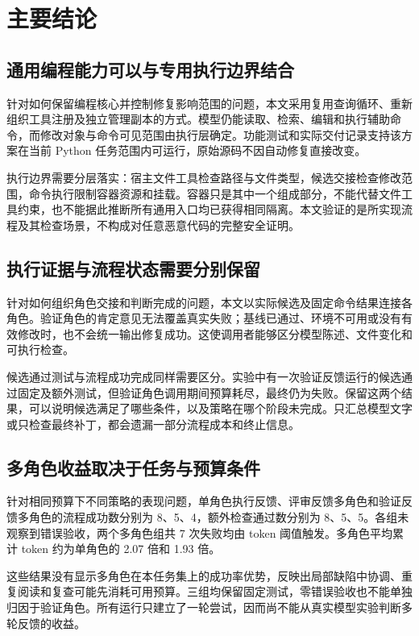\section{主要结论}\label{sec:7.2}

\subsection{通用编程能力可以与专用执行边界结合}\label{sec:7.2.1}

针对如何保留编程核心并控制修复影响范围的问题，本文采用复用查询循环、重新组织工具注册及独立管理副本的方式。模型仍能读取、检索、编辑和执行辅助命令，而修改对象与命令可见范围由执行层确定。功能测试和实际交付记录支持该方案在当前 Python 任务范围内可运行，原始源码不因自动修复直接改变。

执行边界需要分层落实：宿主文件工具检查路径与文件类型，候选交接检查修改范围，命令执行限制容器资源和挂载。容器只是其中一个组成部分，不能代替文件工具约束，也不能据此推断所有通用入口均已获得相同隔离。本文验证的是所实现流程及其检查场景，不构成对任意恶意代码的完整安全证明。

\subsection{执行证据与流程状态需要分别保留}\label{sec:7.2.2}

针对如何组织角色交接和判断完成的问题，本文以实际候选及固定命令结果连接各角色。验证角色的肯定意见无法覆盖真实失败；基线已通过、环境不可用或没有有效修改时，也不会统一输出修复成功。这使调用者能够区分模型陈述、文件变化和可执行检查。

候选通过测试与流程成功完成同样需要区分。实验中有一次验证反馈运行的候选通过固定及额外测试，但验证角色调用期间预算耗尽，最终仍为失败。保留这两个结果，可以说明候选满足了哪些条件，以及策略在哪个阶段未完成。只汇总模型文字或只检查最终补丁，都会遗漏一部分流程成本和终止信息。

\subsection{多角色收益取决于任务与预算条件}\label{sec:7.2.3}

针对相同预算下不同策略的表现问题，单角色执行反馈、评审反馈多角色和验证反馈多角色的流程成功数分别为 8、5、4，额外检查通过数分别为 8、5、5。各组未观察到错误验收，两个多角色组共 7 次失败均由 token 阈值触发。多角色平均累计 token 约为单角色的 2.07 倍和 1.93 倍。

这些结果没有显示多角色在本任务集上的成功率优势，反映出局部缺陷中协调、重复阅读和复查可能先消耗可用预算。三组均保留固定测试，零错误验收也不能单独归因于验证角色。所有运行只建立了一轮尝试，因而尚不能从真实模型实验判断多轮反馈的收益。

